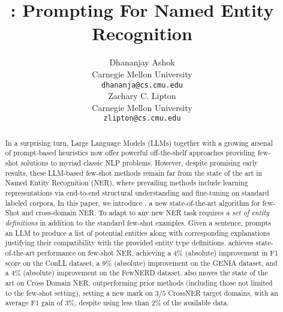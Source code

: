 \documentclass[11pt]{article}
\title{\toolname: Prompting For Named Entity Recognition}
\author{Dhananjay Ashok \\
  Carnegie Mellon University\\
  \texttt{dhananja@cs.cmu.edu} \\\And
  Zachary C. Lipton \\
    Carnegie Mellon University\\
  \texttt{zlipton@cs.cmu.edu} \\}
\begin{document}
\maketitle
\begin{abstract}
In a surprising turn, Large Language Models (LLMs) together with a growing arsenal of prompt-based heuristics
now offer powerful off-the-shelf approaches providing few-shot solutions to myriad classic NLP problems. 
However, despite promising early results, these LLM-based few-shot methods remain far from the state of the art in Named Entity Recognition (NER), where prevailing methods include learning representations via end-to-end structural understanding and fine-tuning on standard labeled corpora. 
In this paper, we introduce \toolname, 
 a new state-of-the-art algorithm for few-Shot and cross-domain NER. To adapt to any new NER task \toolname requires \emph{a set of entity definitions} in addition to the standard few-shot examples. 
Given a sentence, \toolname prompts an LLM to produce  a list of potential entities along with corresponding explanations justifying their compatibility with the provided entity type definitions. 
\toolname achieves state-of-the-art performance on few-shot NER,
achieving a 4\% (absolute) improvement in F1 score on the ConLL dataset, a 9\% (absolute) improvement on the GENIA dataset, and a 4\% (absolute) improvement on the FewNERD dataset.
\toolname also moves the state of the art on Cross Domain NER, outperforming prior methods (including those not limited to the few-shot setting), setting a new mark on $3/5$ CrossNER target domains, with an average F1 gain of $3\%$, despite using less than $2\%$ of the available data. \end{abstract}
\end{document}
